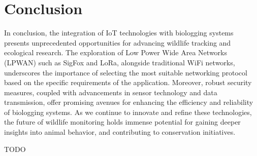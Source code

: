 \documentclass[sigplan,screen,nonacm]{acmart}
\begin{document}
\section{Conclusion}
\label{sec:Coclusion}

In conclusion, the integration of IoT technologies with biologging systems presents unprecedented opportunities for 
advancing wildlife tracking and ecological research. The exploration of Low Power Wide Area Networks (LPWAN) such 
as SigFox and LoRa, alongside traditional WiFi networks, underscores the importance of selecting the most suitable 
networking protocol based on the specific requirements of the application. Moreover, robust security measures, coupled 
with advancements in sensor technology and data transmission, offer promising avenues for enhancing the efficiency 
and reliability of biologging systems. As we continue to innovate and refine these technologies, the future of 
wildlife monitoring holds immense potential for gaining deeper insights into animal behavior, and contributing to 
conservation initiatives.

\begin{acks}
  TODO
\end{acks}



\end{document}
